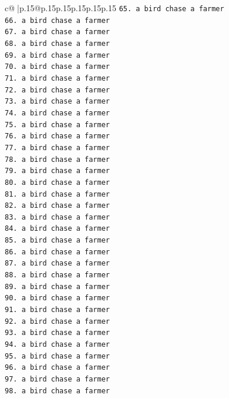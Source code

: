 \documentclass{article}
\begin{document}
{\begin{supertabular}{c@{$\;$}|p{.15\linewidth}@{}p{.15\linewidth}p{.15\linewidth}p{.15\linewidth}p{.15\linewidth}p{.15\linewidth}}
{{{\texttt{65. a bird chase a farmer} \\
\texttt{66. a bird chase a farmer} \\
\texttt{67. a bird chase a farmer} \\
\texttt{68. a bird chase a farmer} \\
\texttt{69. a bird chase a farmer} \\
\texttt{70. a bird chase a farmer} \\
\texttt{71. a bird chase a farmer} \\
\texttt{72. a bird chase a farmer} \\
\texttt{73. a bird chase a farmer} \\
\texttt{74. a bird chase a farmer} \\
\texttt{75. a bird chase a farmer} \\
\texttt{76. a bird chase a farmer} \\
\texttt{77. a bird chase a farmer} \\
\texttt{78. a bird chase a farmer} \\
\texttt{79. a bird chase a farmer} \\
\texttt{80. a bird chase a farmer} \\
\texttt{81. a bird chase a farmer} \\
\texttt{82. a bird chase a farmer} \\
\texttt{83. a bird chase a farmer} \\
\texttt{84. a bird chase a farmer} \\
\texttt{85. a bird chase a farmer} \\
\texttt{86. a bird chase a farmer} \\
\texttt{87. a bird chase a farmer} \\
\texttt{88. a bird chase a farmer} \\
\texttt{89. a bird chase a farmer} \\
\texttt{90. a bird chase a farmer} \\
\texttt{91. a bird chase a farmer} \\
\texttt{92. a bird chase a farmer} \\
\texttt{93. a bird chase a farmer} \\
\texttt{94. a bird chase a farmer} \\
\texttt{95. a bird chase a farmer} \\
\texttt{96. a bird chase a farmer} \\
\texttt{97. a bird chase a farmer} \\
\texttt{98. a bird chase a farmer} \\
}}}
\end{supertabular}}
\end{document}
